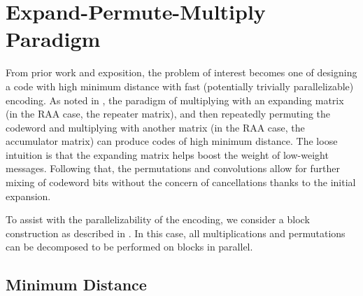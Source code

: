 \section{Expand-Permute-Multiply Paradigm}\label{sec:permutemultiply}


From prior work and exposition, the problem of interest becomes one of designing a code with high minimum distance with fast (potentially trivially parallelizable) encoding. As noted in , the paradigm of multiplying with an expanding matrix (in the RAA case, the repeater matrix), and then repeatedly permuting the codeword and multiplying with another matrix (in the RAA case, the accumulator matrix) can produce codes of high minimum distance. The loose intuition is that the expanding matrix helps boost the weight of low-weight messages. Following that, the permutations and convolutions allow for further mixing of codeword bits without the concern of cancellations thanks to the initial expansion. 

To assist with the parallelizability of the encoding, we consider a block construction as described in . In this case, all multiplications and permutations can be decomposed to be performed on blocks in parallel.


\subsection{Minimum Distance}\label{sec:mindist}


